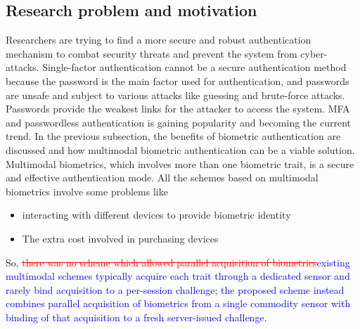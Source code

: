\documentclass[10pt,journal,compsoc]{IEEEtran}
\begin{document}
    \subsection{Research problem and motivation}
    Researchers are trying to find a more secure and robust authentication mechanism to combat security threats and prevent the system from cyber-attacks. Single-factor authentication cannot be a secure authentication method because the password is the main factor used for authentication, and passwords are unsafe and subject to various attacks like guessing and brute-force attacks. Passwords provide the weakest links for the attacker to access the system. MFA  and passwordless authentication is gaining popularity and becoming the current trend. In the previous subsection, the benefits of biometric authentication are discussed and how multimodal biometric authentication can be a viable solution. Multimodal biometrics, which involves more than one biometric trait, is a secure and effective authentication mode. All the schemes based on multimodal biometrics involve some problems like 
\begin{itemize}
    \item interacting with different devices to provide biometric identity
    \item The extra cost involved in purchasing devices
\end{itemize}
So, \textcolor{red}{\sout{there was no scheme which allowed parallel acquisition of biometrics}}\textcolor{blue}{existing multimodal schemes typically acquire each trait through a dedicated sensor and rarely bind acquisition to a per-session challenge; the proposed scheme instead combines parallel acquisition of biometrics from a single commodity sensor with binding of that acquisition to a fresh server-issued challenge}.
\end{document}
